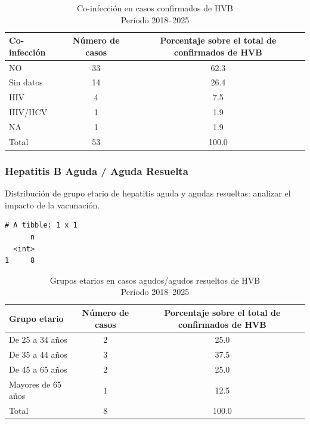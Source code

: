 \documentclass[
  letterpaper,
  DIV=11,
  numbers=noendperiod]{scrartcl}
\begin{document}
\begin{table}
\caption*{
{\fontsize{20}{25}\selectfont  Co-infección en casos confirmados de HVB\fontsize{12}{15}\selectfont } \\ 
{\fontsize{14}{17}\selectfont  Período 2018–2025\fontsize{12}{15}\selectfont }
} 
\fontsize{12.0pt}{14.0pt}\selectfont
\begin{tabular*}{\linewidth}{@{\extracolsep{\fill}}lcc}
\toprule
Co-infección  & Número de casos & Porcentaje sobre el total de confirmados de HVB \\ 
\midrule\addlinespace[2.5pt]
NO & 33 & 62.3 \\ 
Sin datos & 14 & 26.4 \\ 
HIV & 4 & 7.5 \\ 
HIV/HCV & 1 & 1.9 \\ 
NA & 1 & 1.9 \\ 
Total & 53 & 100.0 \\ 
\bottomrule
\end{tabular*}
\end{table}

\hypertarget{hepatitis-b-aguda-aguda-resuelta}{%
\subsubsection{\texorpdfstring{\textbf{Hepatitis B Aguda / Aguda
Resuelta}}{Hepatitis B Aguda / Aguda Resuelta}}\label{hepatitis-b-aguda-aguda-resuelta}}

Distribución de grupo etario de hepatitis aguda y agudas resueltas:
analizar el impacto de la vacunación.

\begin{verbatim}
# A tibble: 1 x 1
      n
  <int>
1     8
\end{verbatim}

\begin{table}
\caption*{
{\fontsize{20}{25}\selectfont  Grupos etarios en casos agudos/agudos resueltos de HVB\fontsize{12}{15}\selectfont } \\ 
{\fontsize{14}{17}\selectfont  Período 2018–2025\fontsize{12}{15}\selectfont }
} 
\fontsize{12.0pt}{14.0pt}\selectfont
\begin{tabular*}{\linewidth}{@{\extracolsep{\fill}}lcc}
\toprule
Grupo etario  & Número de casos & Porcentaje sobre el total de confirmados de HVB \\ 
\midrule\addlinespace[2.5pt]
De 25 a 34 años & 2 & 25.0 \\ 
De 35 a 44 años & 3 & 37.5 \\ 
De 45 a 65 años & 2 & 25.0 \\ 
Mayores de 65 años & 1 & 12.5 \\ 
Total & 8 & 100.0 \\ 
\bottomrule
\end{tabular*}
\end{table}
\end{document}

